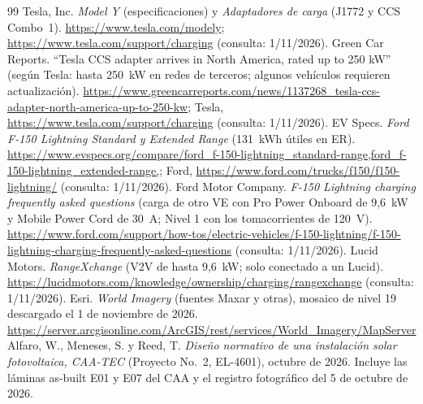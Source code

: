 \begin{thebibliography}{99}
 Tesla, Inc. \emph{Model Y} (especificaciones) y \emph{Adaptadores de carga} (J1772 y CCS Combo~1). \url{https://www.tesla.com/modely}; \url{https://www.tesla.com/support/charging} (consulta: 1/11/2026).
 Green Car Reports. ``Tesla CCS adapter arrives in North America, rated up to 250 kW'' (según Tesla: hasta 250~kW en redes de terceros; algunos vehículos requieren actualización). \url{https://www.greencarreports.com/news/1137268_tesla-ccs-adapter-north-america-up-to-250-kw}; Tesla, \url{https://www.tesla.com/support/charging} (consulta: 1/11/2026).
 EV Specs. \emph{Ford F-150 Lightning Standard y Extended Range} (131~kWh útiles en ER). \url{https://www.evspecs.org/compare/ford_f-150-lightning_standard-range,ford_f-150-lightning_extended-range,}; Ford, \url{https://www.ford.com/trucks/f150/f150-lightning/} (consulta: 1/11/2026).
 Ford Motor Company. \emph{F-150 Lightning charging frequently asked questions} (carga de otro VE con Pro Power Onboard de 9,6~kW y Mobile Power Cord de 30~A; Nivel 1 con los tomacorrientes de 120~V). \url{https://www.ford.com/support/how-tos/electric-vehicles/f-150-lightning/f-150-lightning-charging-frequently-asked-questions} (consulta: 1/11/2026).
 Lucid Motors. \emph{RangeXchange} (V2V de hasta 9,6~kW; solo conectado a un Lucid). \url{https://lucidmotors.com/knowledge/ownership/charging/rangexchange} (consulta: 1/11/2026).
 Esri. \emph{World Imagery} (fuentes Maxar y otras), mosaico de nivel 19 descargado el 1 de noviembre de 2026. \url{https://server.arcgisonline.com/ArcGIS/rest/services/World_Imagery/MapServer}
 Alfaro, W., Meneses, S. y Reed, T. \emph{Diseño normativo de una instalación solar fotovoltaica, CAA-TEC} (Proyecto No.~2, EL-4601), octubre de 2026. Incluye las láminas as-built E01 y E07 del CAA y el registro fotográfico del 5 de octubre de 2026.
\end{thebibliography}
